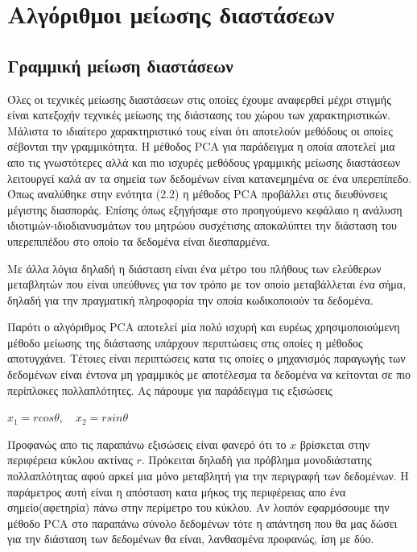 
\chapter{Αλγόριθμοι μείωσης διαστάσεων}

\section{Γραμμική μείωση διαστάσεων}
\par
Όλες οι τεχνικές μείωσης διαστάσεων στις οποίες έχουμε αναφερθεί μέχρι στιγμής είναι κατεξοχήν τεχνικές μείωσης της διάστασης του χώρου των χαρακτηριστικών. Μάλιστα το ιδιαίτερο χαρακτηριστικό τους είναι ότι αποτελούν μεθόδους οι οποίες σέβονται την γραμμικότητα. Η μέθοδος \textlatin{PCA}\textlatin{\cite{pca}} για παράδειγμα η οποία αποτελεί μια απο τις γνωστότερες αλλά και πιο ισχυρές μεθόδους γραμμικής μείωσης διαστάσεων λειτουργεί καλά αν τα σημεία των δεδομένων είναι κατανεμημένα σε ένα υπερεπίπεδο. Όπως αναλύθηκε στην ενότητα (2.2) η μέθοδος \textlatin{PCA}\textlatin{\cite{pca}} προβάλλει στις διευθύνσεις μέγιστης διασποράς. Επίσης όπως εξηγήσαμε στο προηγούμενο κεφάλαιο η ανάλυση ιδιοτιμών-ιδιοδιανυσμάτων του μητρώου συσχέτισης αποκαλύπτει την διάσταση του υπερεπιπέδου στο οποίο τα δεδομένα είναι διεσπαρμένα. 
\par
Με άλλα λόγια δηλαδή η διάσταση είναι ένα μέτρο του πλήθους των ελεύθερων μεταβλητών που είναι υπεύθυνες για τον τρόπο με τον οποίο μεταβάλλεται ένα σήμα, δηλαδή για την πραγματική πληροφορία την οποία κωδικοποιούν τα δεδομένα. 
\par
Παρότι ο αλγόριθμος \textlatin{PCA}\textlatin{\cite{pca}} αποτελεί μία πολύ ισχυρή και ευρέως χρησιμοποιούμενη μέθοδο μείωσης της διάστασης υπάρχουν περιπτώσεις στις οποίες η μέθοδος αποτυγχάνει. Τέτοιες είναι περιπτώσεις κατα τις οποίες ο μηχανισμός παραγωγής των δεδομένων είναι έντονα μη γραμμικός με αποτέλεσμα τα δεδομένα να κείτονται σε πιο περίπλοκες πολλαπλότητες. Ας πάρουμε για παράδειγμα τις εξισώσεις \\
\begin{center}
$x_{1}=r cos\theta, \quad x_{2}=rsin\theta$
\end{center}
Προφανώς απο τις παραπάνω εξισώσεις είναι φανερό ότι το $x$ βρίσκεται στην περιφέρεια κύκλου ακτίνας $r$. Πρόκειται δηλαδή για πρόβλημα μονοδιάστατης πολλαπλότητας αφού αρκεί μια μόνο μεταβλητή για την περιγραφή των δεδομένων. Η παράμετρος αυτή είναι η απόσταση κατα μήκος της περιφέρειας απο ένα σημείο(αφετηρία) πάνω στην περίμετρο του κύκλου. Αν λοιπόν εφαρμόσουμε την μέθοδο \textlatin{PCA}\textlatin{\cite{pca}} στο παραπάνω σύνολο δεδομένων τότε η απάντηση που θα μας δώσει για την διάσταση των δεδομένων θα είναι, λανθασμένα προφανώς, ίση με δύο. 
